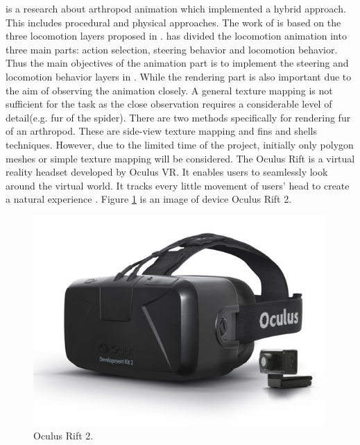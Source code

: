\cite{thesis} is a research about arthropod animation which implemented a hybrid approach. This includes procedural and physical approaches. The work of \cite{thesis} is based on the three locomotion layers proposed in \cite{steering}. \cite{steering} has divided the locomotion animation into three main parts: action selection, steering behavior and locomotion behavior. Thus the main objectives of the animation part is to implement the steering and locomotion behavior layers in \cite{steering}.
While the rendering part is also important due to the aim of observing the animation closely. A general texture mapping is not sufficient for the task as the close observation requires a considerable level of detail(e.g. fur of the spider). There are two methods specifically for rendering fur of an arthropod. These are side-view texture mapping and fins and shells techniques\cite{fur}. However, due to the limited time of the project, initially only polygon meshes or simple texture mapping will be considered.
The Oculus Rift is a virtual reality headset developed by Oculus VR. It enables users to seamlessly look around the virtual world. It tracks every little movement of users' head to create a natural experience \cite{rift1}. Figure \ref{fig:rift} is an image of device Oculus Rift 2.
\begin{figure}[ht!]
\centering
\includegraphics[height=8cm]{figures/rift.jpg}
\caption{Oculus Rift 2. \protect\cite{rift1}}
\label{fig:rift}
\end{figure}
